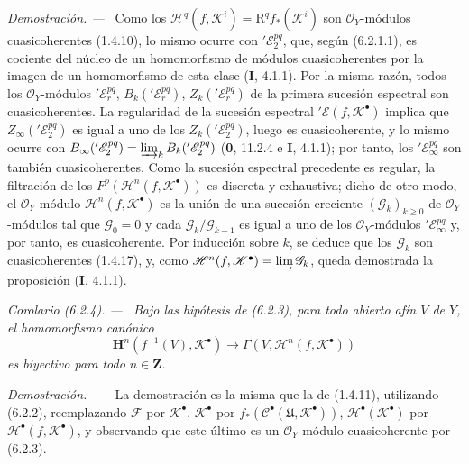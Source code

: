 \documentclass[10pt,oneside]{book}
\newcommand{\oldpage}[2][]{\setcounter{footnote}{0}\marginpar{\scriptsize\textbf{#1}~|~#2}\ignorespaces}
\newenvironment{corollary}[1][]{\par\medskip\noindent\itshape Corolario (#1). ---\ }{\par}
\newenvironment{proof}{\par\medskip\noindent\textit{Demostración. ---\ }}{\par}
\begin{document}
\begin{proof}
Como los $\mathscr H^q(f,\mathscr K^i)=\mathrm R^q f_*(\mathscr K^i)$ son
$\mathscr O_Y$-módulos cuasicoherentes (1.4.10), lo mismo ocurre con
$'\mathscr E_2^{pq}$, que, según (6.2.1.1), es cociente del núcleo de un
homomorfismo de módulos cuasicoherentes por la imagen de un homomorfismo de
esta clase (\textbf I, 4.1.1). Por la misma razón, todos los
$\mathscr O_Y$-módulos $'\mathscr E_r^{pq}$,
$B_k('\mathscr E_r^{pq})$, $Z_k('\mathscr E_r^{pq})$ de la primera sucesión
espectral son cuasicoherentes. La regularidad de la sucesión espectral
$'\mathscr E(f,\mathscr K^\bullet)$ implica que
$Z_\infty('\mathscr E_2^{pq})$ es igual a uno de los
$Z_k('\mathscr E_2^{pq})$, luego es cuasicoherente, y lo mismo ocurre con
$B_\infty('\mathscr E_2^{pq})=\varinjlim_k B_k('\mathscr E_2^{pq})$
(\textbf 0, 11.2.4 e \textbf I, 4.1.1); por tanto, los $'\mathscr E_\infty^{pq}$ son también
cuasicoherentes. Como la sucesión espectral precedente es regular, la
filtración de los $F^p(\mathscr H^n(f,\mathscr K^\bullet))$ es discreta y
exhaustiva; dicho de otro modo, el $\mathscr O_Y$-módulo
$\mathscr H^n(f,\mathscr K^\bullet)$ es la unión de una sucesión creciente
$(\mathscr G_k)_{k\geq0}$ de $\mathscr O_Y$-módulos tal que
$\mathscr G_0=0$ y cada $\mathscr G_k/\mathscr G_{k-1}$ es igual a uno de los
$\mathscr O_Y$-módulos $'\mathscr E_\infty^{pq}$ y, por tanto, es
cuasicoherente. Por inducción sobre $k$, se deduce que los $\mathscr G_k$ son
cuasicoherentes (1.4.17), y, como
$\mathscr H^n(f,\mathscr K^\bullet)=\varinjlim\mathscr G_k$, queda demostrada
la proposición (\textbf I, 4.1.1).
\end{proof}

\oldpage[III]{140}

\begin{corollary}[6.2.4]
Bajo las hipótesis de (6.2.3), para todo abierto afín $V$ de $Y$, el
homomorfismo canónico
\[
  \mathbf H^n(f^{-1}(V),\mathscr K^\bullet)
  \longrightarrow
  \Gamma(V,\mathscr H^n(f,\mathscr K^\bullet))
  \tag{6.2.4.1}\label{III.6.2.4.1}
\]
es biyectivo para todo $n\in\mathbf Z$.
\end{corollary}

\begin{proof}
La demostración es la misma que la de (1.4.11), utilizando (6.2.2),
reemplazando $\mathscr F$ por $\mathscr K^\bullet$,
$\mathscr K^\bullet$ por
$f_*(\mathscr C^\bullet(\mathfrak U,\mathscr K^\bullet))$,
$\mathscr H^\bullet(\mathscr K^\bullet)$ por
$\mathscr H^\bullet(f,\mathscr K^\bullet)$, y observando que este último es un
$\mathscr O_Y$-módulo cuasicoherente por (6.2.3).
\end{proof}
\end{document}
